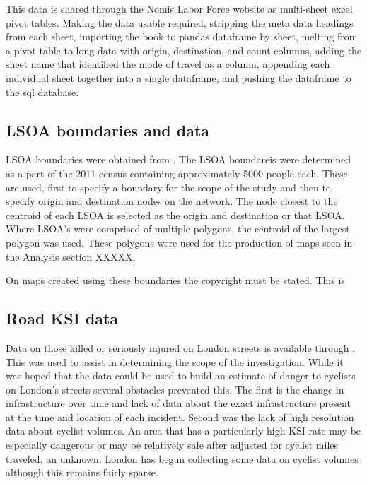 This data is shared through the Nomis Labor Force website as multi-sheet excel pivot tables. Making the data usable required, stripping the meta data headings from each sheet, importing the book to pandas dataframe by sheet, melting from a pivot table to long data with origin, destination, and count columns, adding the sheet name that identified the mode of travel as a column, appending each individual sheet together into a single dataframe, and pushing the dataframe to the sql database. 

\subsection{LSOA boundaries and data}
	
LSOA boundaries were obtained from  \cite{lsoageoms}. The LSOA boundareis were determined as a part of the 2011 census containing approximately 5000 people each. These are used, first to specify a boundary for the scope of the study and then to specify origin and destination nodes on the network. The node closest to the centroid of each LSOA is selected as the origin and destination or that LSOA. Where LSOA's were comprised of multiple polygons, the centroid of the largest polygon was used. These polygons were used for the production of maps seen in the Analysis section XXXXX. 

On maps created using these boundaries the copyright must be stated. This is
	
\subsection{Road KSI data}

Data on those killed or seriously injured on London streets is available through \cite{cyclistksi}. This was used to assist in determining the scope of the investigation. While it was hoped that the data could be used to build an estimate of danger to cyclists on London's streets several obstacles prevented this. The first is the change in infrastructure over time and lack of data about the exact infrastructure present at the time and location of each incident. Second was the lack of high resolution data about cyclist volumes. An area that has a particularly high KSI rate may be especially dangerous or may be relatively safe after adjusted for cyclist miles traveled, an unknown. London has begun collecting some data on cyclist volumes although this remains fairly sparse. 
	

